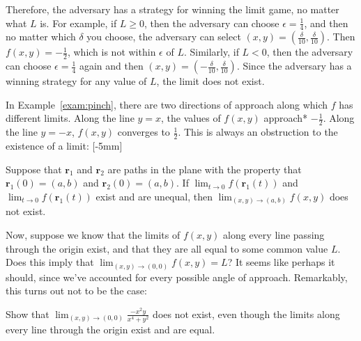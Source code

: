 \documentclass[svgnames]{watsonbook}
\begin{document}
\begin{solution}
  Therefore, the adversary has a strategy for winning the limit game,
  no matter what $L$ is. For example, if $L \geq 0$, then the
  adversary can choose $\epsilon = \tfrac{1}{4}$, and then no matter
  which $\delta$ you choose, the adversary can select
  $(x,y) = (\frac{\delta}{10}, \frac{\delta}{10})$. Then
  $f(x,y) = -\tfrac{1}{2}$, which is not within $\epsilon$ of
  $L$. Similarly, if $L < 0$, then the adversary can choose $\epsilon
  = \tfrac{1}{4}$ again and then $(x,y) = (-\frac{\delta}{10},
  \frac{\delta}{10})$. Since the adversary has a winning strategy for any value of
  $L$, the limit does not exist.
\end{solution}

In Example~\ref{exam:pinch}, there are two directions of approach
along which $f$ has different limits. Along the line $y = x$, the
values of $f(x,y)$ approach* $-\tfrac{1}{2}$. Along the line $y = -x$,
$f(x,y)$ converges to $\tfrac{1}{2}$. This is always an obstruction to
the existence of a limit: [-5mm]

\begin{exercise}{}{}
  Suppose that $\mathbf{r}_1$ and $\mathbf{r}_2$ are paths in the
  plane with the property that $\mathbf{r}_1(0) = (a,b)$ and
  $\mathbf{r}_2(0) = (a,b)$. If $\lim_{t \to 0}f(\mathbf{r}_1(t))$ and
  $\lim_{t \to 0}f(\mathbf{r}_1(t))$ exist and are unequal, then
  $\displaystyle{\lim_{(x,y) \to (a,b)} f(x,y)}$ does not exist. 
\end{exercise}

Now, suppose we know that the limits of $f(x,y)$ along every line
passing through the origin exist, and that they are all equal to some
common value $L$. Does
this imply that $\lim_{(x,y) \to (0,0)}f(x,y) = L$? It seems like
perhaps it should, since we've accounted for every possible angle of
approach. Remarkably, this turns out not to be the case:

\begin{example}{}{}
  Show that $\lim_{(x,y) \to (0,0)}\frac{-x^2 y }{x^4 + y^2}$ does not
  exist, even though the limits along every line through the origin
  exist and are equal. 
\end{example}
\end{document}
